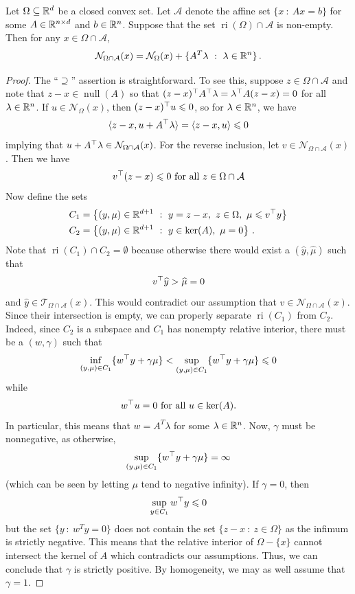 \begin{proposition}\label{prop:normal-cone-intersection}
Let $\Omega \subseteq \mathbb{R}^d$ be a closed convex set.  Let $\mathcal{A}$ denote the affine set $\{x~:~Ax = b\}$ for some $A \in \mathbb{R}^{n \times d}$ and $b \in \mathbb{R}^n$.  Suppose that the set $\operatorname{ri}(\Omega) \cap \mathcal{A}$ is non-empty. Then for any $x \in \Omega \cap \mathcal{A}$,
$$\mathcal{N}_{\Omega \cap \mathcal{A}} (x)= \mathcal{N}_{\Omega}(x) + \{A^T \lambda~:~\lambda \in \mathbb{R}^n\}\,.$$
\end{proposition}

\begin{proof}
The ``$\supseteq$'' assertion is straightforward.  To see this, suppose $z \in \Omega \cap \mathcal{A}$ and note that $z-x \in \operatorname{null}(A)$ so that $(z-x)^\top A^\top \lambda = \lambda^\top A(z-x) = 0$ for all $\lambda \in \mathbb{R}^n$. If $u \in \mathcal{N}_{\Omega}(x)$, then $(z-x)^\top u \leqslant 0$, so for $\lambda\in \mathbb{R}^n$, we have
\[
	\langle z-x, u + A^\top \lambda \rangle = \langle z-x,u \rangle \leqslant 0
\]
implying that $u+A^\top \lambda \in \mathcal{N}_{\Omega \cap \mathcal{A}}(x)$. For the reverse inclusion, let $v \in \mathcal{N}_{\Omega \cap \mathcal{A}}(x)$.  Then we have
\[
	v^\top (z-x) \leqslant 0 \text{ for all $z \in \Omega \cap \mathcal{A}$}
\]
Now define the sets
\[
\begin{aligned}
	C_1 &=\left\{ (y,\mu) \in \mathbb{R}^{d+1}~:~ y =z-x,\,\, z\in \Omega,\,\,\mu \leqslant v^\top y\right\}\\
	C_2 &= \left\{ (y,\mu) \in \mathbb{R}^{d+1}~:~ y \in \operatorname{ker}(A),\,\,\mu = 0\right\}\,.
\end{aligned}
\]
Note that $\operatorname{ri}(C_1) \cap C_2 = \emptyset$ because otherwise there would exist a $(\hat{y},\hat{\mu})$ such that
\[
	v^\top \widehat{y} > \widehat{\mu} = 0
\]
and $\hat{y} \in \mathcal{T}_{\Omega \cap \mathcal{A}}(x)$.  This would contradict our assumption that
$v \in \mathcal{N}_{\Omega \cap \mathcal{A}}(x)$.  Since their intersection is empty, we can properly separate $\operatorname{ri}(C_1)$ from $C_2$.  Indeed, since $C_2$ is a subspace and $C_1$ has nonempty relative interior, there must be a $(w,\gamma)$ such that
\[
	\inf_{(y,\mu)\in C_1} \{ w^\top y + \gamma \mu\} <	\sup_{(y,\mu)\in C_1} \{ w^\top y + \gamma \mu\} \leqslant 0
\]
while
\[
	w^\top u = 0 \text{ for all $u \in \ker(A)$.}
\]
In particular, this means that $w=A^T \lambda$  for some $\lambda \in \mathbb{R}^n$. Now, $\gamma$ must be nonnegative, as otherwise, 
\[
	\sup_{(y,\mu)\in C_1} \{ w^\top y + \gamma \mu\} = \infty
\]
(which can be seen by letting $\mu$ tend to negative infinity).  If $\gamma=0$, then
\[
	\sup_{y \in C_1} w^\top y \leqslant 0
\]
but the set $\{y~:~w^T y = 0\}$ does not contain the set $\{z-x~:~z\in\Omega\}$ as the infimum is strictly negative.  This means that the relative interior of $\Omega -\{x\}$ cannot intersect the kernel of $A$ which contradicts our assumptions.  Thus, we can conclude that $\gamma$ is strictly positive.  By homogeneity, we may as well assume that $\gamma = 1$.


\end{proof}
